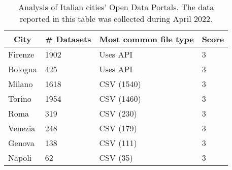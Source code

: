 \begin{table}[!ht]
  \onehalfspacing
  \centering
  \begin{tabular}{|l|l|l|l|}
    \hline
    \multicolumn{1}{|c|}{\textbf{City}} & \multicolumn{1}{c|}{\textbf{\# Datasets}} & \multicolumn{1}{c|}{\textbf{Most common file type}} & \multicolumn{1}{c|}{\textbf{Score}} \\ \hline
    Firenze                   & 1902                                             & Uses \acs{API}                                       & 3                                   \\ \hline
    Bologna                   & 425                                              & Uses \acs{API}                                       & 3                                   \\ \hline
    Milano                    & 1618                                             & CSV (1540)                                           & 3                                   \\ \hline
    Torino                    & 1954                                             & CSV (1460)                                           & 3                                   \\ \hline
    Roma                      & 319                                              & CSV (230)                                            & 3                                   \\ \hline
    Venezia                   & 248                                              & CSV (179)                                            & 3                                   \\ \hline
    Genova                    & 138                                              & CSV (111)                                            & 3                                   \\ \hline
    Napoli                    & 62                                               & CSV (35)                                             & 3                                   \\ \hline
  \end{tabular}
  \caption{Analysis of Italian cities' Open Data Portals. The data reported in this table was collected during April 2022.}
  \label{tab:italian-cities}
\end{table}